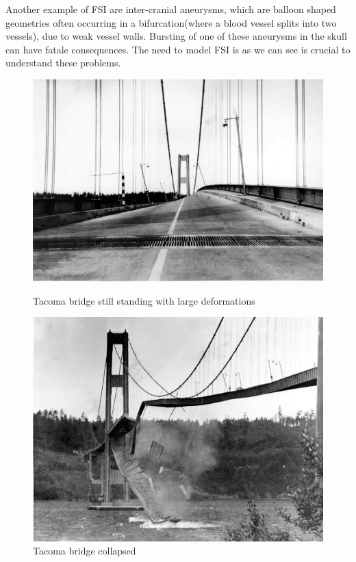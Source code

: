 Another example of FSI are inter-cranial aneurysms, which are balloon shaped geometries often occurring in a bifurcation(where a blood vessel splits into two vessels), due to weak vessel walls. Bursting of one of these aneurysms in the skull can have fatale consequences. The need to model FSI is as we can see is crucial to understand these problems. \newline
\begin{figure}
\centering
\begin{minipage}{.51\textwidth}
  \centering
  \includegraphics[width=.95\linewidth]{./IntroductionToFSI/tacoma2.jpeg}
  \caption{Tacoma bridge still standing with large deformations}
  \label{fig:test1}
\end{minipage}%
\begin{minipage}{.50\textwidth}
  \centering
  \includegraphics[width=.95\linewidth]{./IntroductionToFSI/tacoma3.jpeg}
  \caption{Tacoma bridge collapsed}
  \label{fig:test2}
\end{minipage}
\end{figure}

